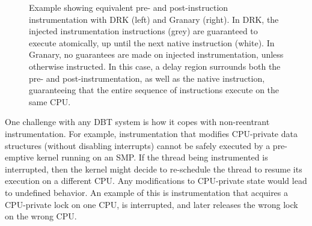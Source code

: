 \documentclass[preprint]{sigplanconf}
\begin{document}
\begin{figure}[t!]
\begin{multicols}{2}
\vspace{-1.5em}\vspace{-2.5em}
\columnbreak
\vspace{-1.5em}\hspace{-0.5em}\vspace{-2.5em}
\end{multicols}
\caption{Example showing equivalent pre- and post-instruction instrumentation with DRK (left) and Granary (right). In DRK, the injected instrumentation instructions (grey) are guaranteed to execute atomically, up until the next native instruction (white). In Granary, no guarantees are made on injected instrumentation, unless otherwise instructed. In this case, a delay region surrounds both the pre- and post-instrumentation, as well as the native instruction, guaranteeing that the entire sequence of instructions execute on the same CPU.}
\end{figure}

One challenge with any DBT system is how it copes with non-reentrant instrumentation. For example, instrumentation that modifies CPU-private data structures (without disabling interrupts) cannot be safely executed by a pre-emptive kernel running on an SMP. If the thread being instrumented is interrupted, then the kernel might decide to re-schedule the thread to resume its execution on a different CPU. Any modifications to CPU-private state would lead to undefined behavior. An example of this is instrumentation that acquires a CPU-private lock on one CPU, is interrupted, and later releases the wrong lock on the wrong CPU.
\end{document}
